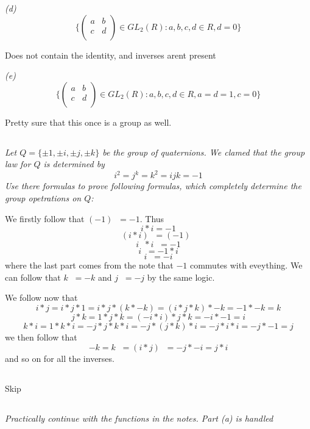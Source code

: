 \documentclass[11pt,oneside,titlepage]{book}
\DeclareMathOperator \inv {^{-1}}
\newcommand{\set}[1]{\{ #1 \}}
\begin{document}
\textit{(d)
  $$\set{
  \begin{pmatrix} a & b \\ c & d \\
  \end{pmatrix} \in GL_2(R): a, b, c, d \in R, d = 0}
  $$
}

Does not contain the identity, and inverses arent present

\textit{(e)
  $$\set{
  \begin{pmatrix} a & b \\ c & d \\
  \end{pmatrix} \in GL_2(R): a, b, c, d \in R, a = d = 1, c = 0}
  $$
}

Pretty sure that this once is a group as well.

\subsection{}

\textit{Let $Q = \set{\pm 1, \pm i, \pm j, \pm k}$ be the group of
quaternions.  We clamed that the group law for $Q$ is determined by
  $$i^2 = j^k = k^2 = i j k = -1$$
  Use there formulas to prove following formulas, which completely
determine the group opetrations on $Q$: }

We firstly follow that $(-1)\inv = -1$. Thus
$$i * i = -1$$
$$(i * i)\inv = (-1)\inv$$
$$i\inv * i\inv = -1$$
$$i\inv = -1 * i $$
$$i\inv = -i$$
where the last part comes from the note that $-1$ commutes with
eveything.  We can follow that $k\inv = -k$ and $j\inv = -j$ by the
same logic.

We follow now that
$$i * j = i * j * 1 = i * j * (k * -k) = (i * j * k) * -k = -1 * -k = k$$
$$j * k = 1 * j * k = (-i * i) * j * k = -i * -1 = i$$
$$k * i =  1 * k * i = -j * j * k * i = -j * (j * k) * i = -j * i * i = -j * -1 = j$$
we then follow that
$$-k = k\inv = (i * j) \inv = -j * -i = j * i$$
and so on for all the inverses.

\subsection{}

Skip

\subsection{}

\textit{Practically continue with the functions in the notes. Part (a)
is handled}
\end{document}
